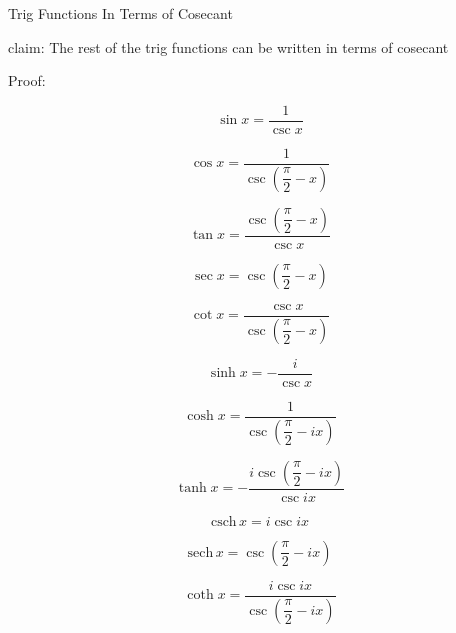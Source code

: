 \documentclass[12pt]{article}
\begin{document}
\pagebreak\begin{section}{Trig Functions In Terms of Cosecant}
	
	\noindent claim: The rest of the trig functions can be written in terms of cosecant

	\noindent Proof:

	\begin{equation}\sin x=\dfrac1{\csc x}\end{equation}

	\begin{equation}\cos x=\dfrac1{\csc\left(\dfrac\pi2-x\right)}\end{equation}

	\begin{equation}\tan x=\dfrac{\csc\left(\dfrac\pi2-x\right)}{\csc x}\end{equation}

	
	\begin{equation}\sec x=\csc\left(\dfrac\pi2-x\right)\end{equation}

	\begin{equation}\cot x=\dfrac{\csc x}{\csc\left(\dfrac\pi2-x\right)}\end{equation}


	\begin{equation}\sinh x=-\dfrac i{\csc x}\end{equation}

	\begin{equation}\cosh x=\dfrac1{\csc\left(\dfrac\pi2-ix\right)}\end{equation}

	\begin{equation}\tanh x=-\dfrac{i\csc\left(\dfrac\pi2-ix\right)}{\csc ix}\end{equation}

	\begin{equation}\text{csch}\,x=i\csc ix\end{equation}

	\begin{equation}\text{sech}\,x=\csc\left(\dfrac\pi2-ix\right)\end{equation}

	\begin{equation}\coth x=\dfrac{i\csc ix}{\csc\left(\dfrac\pi2-ix\right)}\end{equation}

	\noindent\blacksquare
\end{section}
\end{document}
